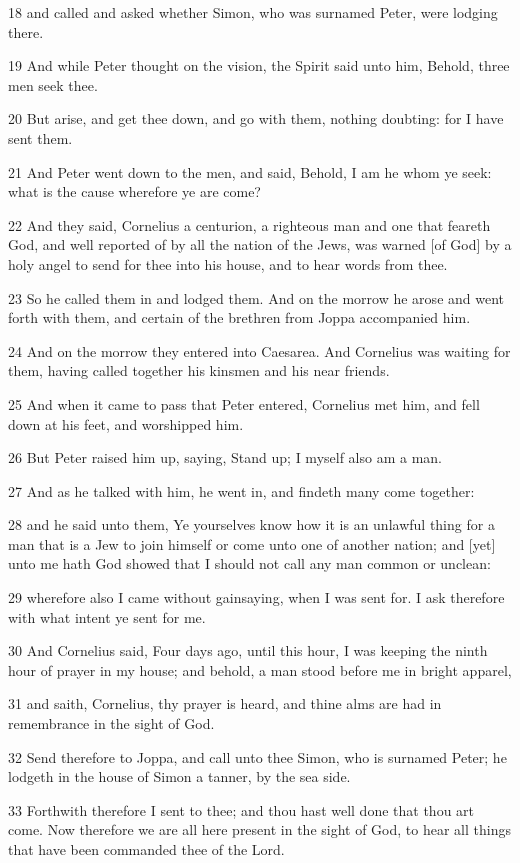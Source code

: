 \par 18 and called and asked whether Simon, who was surnamed Peter, were lodging there.
\par 19 And while Peter thought on the vision, the Spirit said unto him, Behold, three men seek thee.
\par 20 But arise, and get thee down, and go with them, nothing doubting: for I have sent them.
\par 21 And Peter went down to the men, and said, Behold, I am he whom ye seek: what is the cause wherefore ye are come?
\par 22 And they said, Cornelius a centurion, a righteous man and one that feareth God, and well reported of by all the nation of the Jews, was warned [of God] by a holy angel to send for thee into his house, and to hear words from thee.
\par 23 So he called them in and lodged them. And on the morrow he arose and went forth with them, and certain of the brethren from Joppa accompanied him.
\par 24 And on the morrow they entered into Caesarea. And Cornelius was waiting for them, having called together his kinsmen and his near friends.
\par 25 And when it came to pass that Peter entered, Cornelius met him, and fell down at his feet, and worshipped him.
\par 26 But Peter raised him up, saying, Stand up; I myself also am a man.
\par 27 And as he talked with him, he went in, and findeth many come together:
\par 28 and he said unto them, Ye yourselves know how it is an unlawful thing for a man that is a Jew to join himself or come unto one of another nation; and [yet] unto me hath God showed that I should not call any man common or unclean:
\par 29 wherefore also I came without gainsaying, when I was sent for. I ask therefore with what intent ye sent for me.
\par 30 And Cornelius said, Four days ago, until this hour, I was keeping the ninth hour of prayer in my house; and behold, a man stood before me in bright apparel,
\par 31 and saith, Cornelius, thy prayer is heard, and thine alms are had in remembrance in the sight of God.
\par 32 Send therefore to Joppa, and call unto thee Simon, who is surnamed Peter; he lodgeth in the house of Simon a tanner, by the sea side.
\par 33 Forthwith therefore I sent to thee; and thou hast well done that thou art come. Now therefore we are all here present in the sight of God, to hear all things that have been commanded thee of the Lord.
